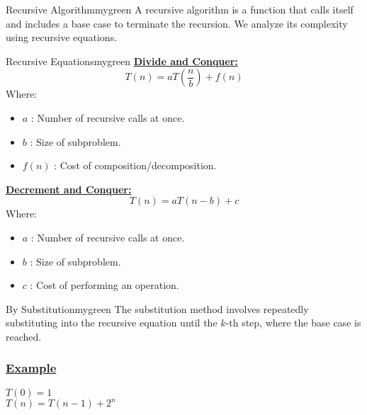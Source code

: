 
\begin{prettyBox}{Recursive Algorithm}{mygreen}
A recursive algorithm is a function that calls itself and includes a base case to terminate the recursion.  
We analyze its complexity using recursive equations.
\end{prettyBox}

\vspace{0.5cm}

\begin{prettyBox}{Recursive Equations}{mygreen}
    \textbf{\underline{Divide and Conquer:}}  
    \[
    T(n) = aT\left(\frac{n}{b}\right) + f(n)
    \]  
    Where: 
    \begin{itemize}
    \item \(a\) : Number of recursive calls at once.  
    \item \(b\) : Size of subproblem.  
    \item \(f(n)\) : Cost of composition/decomposition.  
    \end{itemize}

    \vspace{0.45cm}

    \textbf{\underline{Decrement and Conquer:}}  
    \[
    T(n) = aT\left(n-b\right) + c
    \]  
    Where:  
    \begin{itemize}
    \item \(a\) : Number of recursive calls at once.  
    \item \(b\) : Size of subproblem.  
    \item \(c\) : Cost of performing an operation.  
    \end{itemize}

\end{prettyBox}

\vspace{0.5cm}


\begin{prettyBox}{By Substitution}{mygreen}
The substitution method involves repeatedly substituting into the recursive equation  
until the \(k\)-th step, where the base case is reached.
\end{prettyBox}

\newpage

\subsubsection*{\underline{Example}}
\vspace{0.1cm}
\(T(0) = 1\)\\
\(T(n) = T(n-1) + 2^n\)

